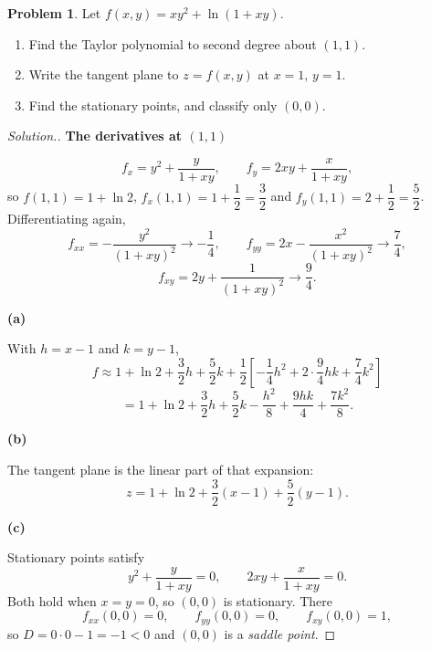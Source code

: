 \documentclass[11pt,a4paper]{article}
\theoremstyle{definition}
\newtheorem{problemx}{Problem}[subsection]
\newenvironment{problem}{\begin{problemx}}{\end{problemx}}
\newenvironment{solution}
  {\renewcommand{\qedsymbol}{}\begin{proof}[\textit{Solution}.]}
  {\end{proof}}
\newcommand{\subhead}[1]{%
  \par\medskip\noindent\textbf{#1}\par\nobreak\smallskip}
\begin{document}
\begin{problem}
Let $f(x,y) = xy^2+\ln(1+xy)$.
\begin{enumerate}
\item[(a)] Find the Taylor polynomial to second degree about $(1,1)$.
\item[(b)] Write the tangent plane to $z = f(x,y)$ at $x=1$, $y=1$.
\item[(c)] Find the stationary points, and classify only $(0,0)$.
\end{enumerate}
\end{problem}
\begin{solution}
\subhead{The derivatives at $(1,1)$}
\[f_x = y^2 + \frac{y}{1+xy},\qquad f_y = 2xy + \frac{x}{1+xy},\]
so $f(1,1) = 1+\ln 2$, $f_x(1,1) = 1+\dfrac12 = \dfrac32$ and
$f_y(1,1) = 2+\dfrac12 = \dfrac52$. Differentiating again,
\[f_{xx} = -\frac{y^2}{(1+xy)^2} \rightarrow -\frac14,\qquad
f_{yy} = 2x - \frac{x^2}{(1+xy)^2} \rightarrow \frac74,\]
\[f_{xy} = 2y + \frac{1}{(1+xy)^2} \rightarrow \frac94 .\]

\subhead{(a)}
With $h = x-1$ and $k = y-1$,
\[f \approx 1+\ln 2 + \frac32h + \frac52k
+ \frac12\left[-\frac14h^2 + 2\cdot\frac94hk + \frac74k^2\right]\]
\[= 1+\ln 2 + \frac32h + \frac52k - \frac{h^2}{8} + \frac{9hk}{4}
+ \frac{7k^2}{8}.\]

\subhead{(b)}
The tangent plane is the linear part of that expansion:
\[z = 1+\ln 2 + \frac32(x-1) + \frac52(y-1).\]

\subhead{(c)}
Stationary points satisfy
\[y^2 + \frac{y}{1+xy} = 0,\qquad 2xy + \frac{x}{1+xy} = 0 .\]
Both hold when $x=y=0$, so $(0,0)$ is stationary. There
\[f_{xx}(0,0) = 0,\qquad f_{yy}(0,0) = 0,\qquad f_{xy}(0,0) = 1 ,\]
so $D = 0\cdot 0 - 1 = -1 < 0$ and $(0,0)$ is a \emph{saddle point}.
\end{solution}
\end{document}
